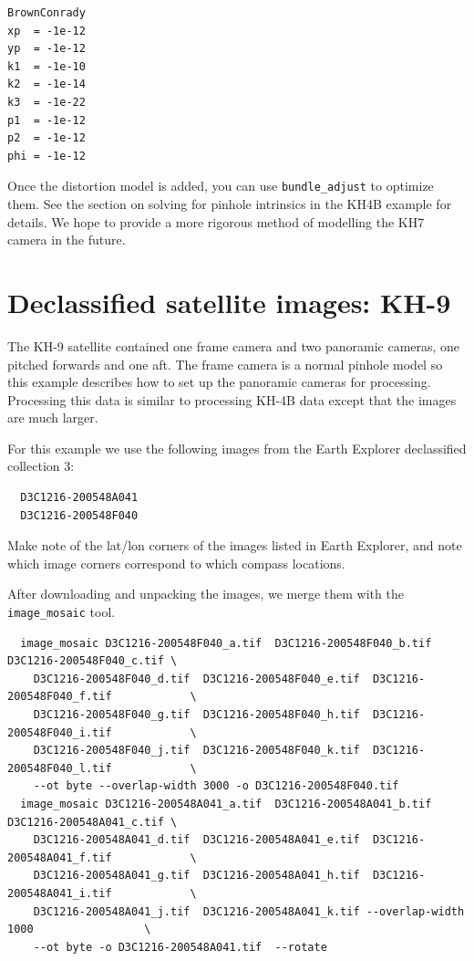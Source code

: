 \begin{verbatim}
BrownConrady
xp  = -1e-12
yp  = -1e-12
k1  = -1e-10
k2  = -1e-14
k3  = -1e-22
p1  = -1e-12
p2  = -1e-12
phi = -1e-12
\end{verbatim}

Once the distortion model is added, you can use \texttt{bundle\_adjust} to optimize
them.  See the section on solving for pinhole intrinsics in the KH4B example for details.
We hope to provide a more rigorous method of modelling the KH7 camera in the future.


\section{Declassified satellite images: KH-9}
\label{kh9}

The KH-9 satellite contained one frame camera and two panoramic cameras,
one pitched forwards and one aft.  The frame camera is a normal pinhole model so
this example describes how to set up the panoramic cameras for processing.
Processing this data is similar to processing KH-4B data except that the 
images are much larger.

For this example we use the following images from the Earth Explorer declassified collection 3:
\begin{verbatim}
  D3C1216-200548A041
  D3C1216-200548F040
\end{verbatim}

Make note of the lat/lon corners of the images listed in Earth Explorer, and note which
image corners correspond to which compass locations.

After downloading and unpacking the images, we merge them with the \texttt{image\_mosaic} tool.

\begin{verbatim}
  image_mosaic D3C1216-200548F040_a.tif  D3C1216-200548F040_b.tif  D3C1216-200548F040_c.tif \
    D3C1216-200548F040_d.tif  D3C1216-200548F040_e.tif  D3C1216-200548F040_f.tif            \
    D3C1216-200548F040_g.tif  D3C1216-200548F040_h.tif  D3C1216-200548F040_i.tif            \
    D3C1216-200548F040_j.tif  D3C1216-200548F040_k.tif  D3C1216-200548F040_l.tif            \
    --ot byte --overlap-width 3000 -o D3C1216-200548F040.tif
  image_mosaic D3C1216-200548A041_a.tif  D3C1216-200548A041_b.tif  D3C1216-200548A041_c.tif \
    D3C1216-200548A041_d.tif  D3C1216-200548A041_e.tif  D3C1216-200548A041_f.tif            \
    D3C1216-200548A041_g.tif  D3C1216-200548A041_h.tif  D3C1216-200548A041_i.tif            \
    D3C1216-200548A041_j.tif  D3C1216-200548A041_k.tif --overlap-width 1000                 \
    --ot byte -o D3C1216-200548A041.tif  --rotate
\end{verbatim}

